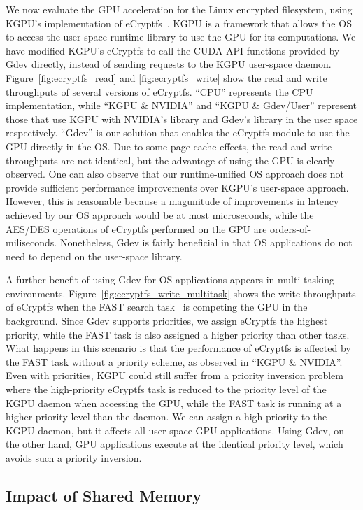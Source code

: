 We now evaluate the GPU acceleration for the Linux encrypted filesystem,
using KGPU's implementation of eCryptfs~\cite{Sun_SECURITY11_Poster}.
KGPU is a framework that allows the OS to access the user-space runtime
library to use the GPU for its computations.
We have modified KGPU's eCryptfs to call the CUDA API functions
provided by Gdev directly, instead of sending requests to the KGPU user-space
daemon.
Figure~\ref{fig:ecryptfs_read} and \ref{fig:ecryptfs_write} show the
read and write throughputs of several versions of eCryptfs.
``CPU'' represents the CPU implementation, while ``KGPU \& NVIDIA'' and
``KGPU \& Gdev/User'' represent those that use KGPU with NVIDIA's
library and Gdev's library in the user space respectively.
``Gdev'' is our solution that enables the eCryptfs module to use the GPU
directly in the OS.
Due to some page cache effects, the read and write throughputs are not
identical, but the advantage of using the GPU is clearly observed.
One can also observe that our runtime-unified OS approach does not
provide sufficient performance improvements over KGPU's user-space
approach.
However, this is reasonable because a magunitude of improvements in
latency achieved by our OS approach would be at most microseconds, while
the AES/DES operations of eCryptfs performed on the GPU are
orders-of-miliseconds.
Nonetheless, Gdev is fairly beneficial in that OS applications do not need
to depend on the user-space library.

A further benefit of using Gdev for OS applications appears in
multi-tasking environments.
Figure~\ref{fig:ecryptfs_write_multitask} shows the write throughputs of
eCryptfs when the FAST search task~\cite{Kim_SIGMOD10} is competing
the GPU in the background.
Since Gdev supports priorities, we assign eCryptfs the highest priority,
while the FAST task is also assigned a higher priority than other tasks.
What happens in this scenario is that the performance of eCryptfs is
affected by the FAST task without a priority scheme, as observed in
``KGPU \& NVIDIA''.
Even with priorities, KGPU could still suffer from a priority inversion
problem where the high-priority eCryptfs task is reduced to the priority
level of the KGPU daemon when accessing the GPU, while the FAST task is
running at a higher-priority level than the daemon.
We can assign a high priority to the KGPU daemon, but it affects all
user-space GPU applications.
Using Gdev, on the other hand, GPU applications execute at the identical
priority level, which avoids such a priority inversion.

\subsection{Impact of Shared Memory}

